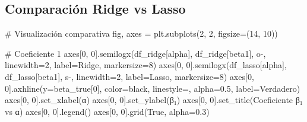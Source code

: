 \documentclass[
  doc,
  floatsintext,
  longtable,
  a4paper,
  nolmodern,
  notxfonts,
  notimes,
  12pt,
  colorlinks=true,linkcolor=blue,citecolor=blue,urlcolor=blue]{apa7}
\newenvironment{Shaded}{\begin{snugshade}}{\end{snugshade}}
\newcommand{\CommentTok}[1]{\textcolor[rgb]{0.37,0.37,0.37}{#1}}
\newcommand{\DecValTok}[1]{\textcolor[rgb]{0.68,0.00,0.00}{#1}}
\newcommand{\FloatTok}[1]{\textcolor[rgb]{0.68,0.00,0.00}{#1}}
\newcommand{\NormalTok}[1]{\textcolor[rgb]{0.00,0.23,0.31}{#1}}
\newcommand{\OperatorTok}[1]{\textcolor[rgb]{0.37,0.37,0.37}{#1}}
\newcommand{\StringTok}[1]{\textcolor[rgb]{0.13,0.47,0.30}{#1}}
\newcommand{\VariableTok}[1]{\textcolor[rgb]{0.07,0.07,0.07}{#1}}
\begin{document}
\subsection{Comparación Ridge vs
Lasso}\label{comparaciuxf3n-ridge-vs-lasso-1}

\begin{Shaded}
\begin{Highlighting}[]
\CommentTok{\# Visualización comparativa}
\NormalTok{fig, axes }\OperatorTok{=}\NormalTok{ plt.subplots(}\DecValTok{2}\NormalTok{, }\DecValTok{2}\NormalTok{, figsize}\OperatorTok{=}\NormalTok{(}\DecValTok{14}\NormalTok{, }\DecValTok{10}\NormalTok{))}

\CommentTok{\# Coeficiente 1}
\NormalTok{axes[}\DecValTok{0}\NormalTok{, }\DecValTok{0}\NormalTok{].semilogx(df\_ridge[}\StringTok{\textquotesingle{}alpha\textquotesingle{}}\NormalTok{], df\_ridge[}\StringTok{\textquotesingle{}beta1\textquotesingle{}}\NormalTok{], }
                    \StringTok{\textquotesingle{}o{-}\textquotesingle{}}\NormalTok{, linewidth}\OperatorTok{=}\DecValTok{2}\NormalTok{, label}\OperatorTok{=}\StringTok{\textquotesingle{}Ridge\textquotesingle{}}\NormalTok{, markersize}\OperatorTok{=}\DecValTok{8}\NormalTok{)}
\NormalTok{axes[}\DecValTok{0}\NormalTok{, }\DecValTok{0}\NormalTok{].semilogx(df\_lasso[}\StringTok{\textquotesingle{}alpha\textquotesingle{}}\NormalTok{], df\_lasso[}\StringTok{\textquotesingle{}beta1\textquotesingle{}}\NormalTok{], }
                    \StringTok{\textquotesingle{}s{-}\textquotesingle{}}\NormalTok{, linewidth}\OperatorTok{=}\DecValTok{2}\NormalTok{, label}\OperatorTok{=}\StringTok{\textquotesingle{}Lasso\textquotesingle{}}\NormalTok{, markersize}\OperatorTok{=}\DecValTok{8}\NormalTok{)}
\NormalTok{axes[}\DecValTok{0}\NormalTok{, }\DecValTok{0}\NormalTok{].axhline(y}\OperatorTok{=}\NormalTok{beta\_true[}\DecValTok{0}\NormalTok{], color}\OperatorTok{=}\StringTok{\textquotesingle{}black\textquotesingle{}}\NormalTok{, linestyle}\OperatorTok{=}\StringTok{\textquotesingle{}{-}{-}\textquotesingle{}}\NormalTok{, }
\NormalTok{                   alpha}\OperatorTok{=}\FloatTok{0.5}\NormalTok{, label}\OperatorTok{=}\StringTok{\textquotesingle{}Verdadero\textquotesingle{}}\NormalTok{)}
\NormalTok{axes[}\DecValTok{0}\NormalTok{, }\DecValTok{0}\NormalTok{].set\_xlabel(}\StringTok{\textquotesingle{}α\textquotesingle{}}\NormalTok{)}
\NormalTok{axes[}\DecValTok{0}\NormalTok{, }\DecValTok{0}\NormalTok{].set\_ylabel(}\StringTok{\textquotesingle{}β₁\textquotesingle{}}\NormalTok{)}
\NormalTok{axes[}\DecValTok{0}\NormalTok{, }\DecValTok{0}\NormalTok{].set\_title(}\StringTok{\textquotesingle{}Coeficiente β₁ vs α\textquotesingle{}}\NormalTok{)}
\NormalTok{axes[}\DecValTok{0}\NormalTok{, }\DecValTok{0}\NormalTok{].legend()}
\NormalTok{axes[}\DecValTok{0}\NormalTok{, }\DecValTok{0}\NormalTok{].grid(}\VariableTok{True}\NormalTok{, alpha}\OperatorTok{=}\FloatTok{0.3}\NormalTok{)}


\end{Highlighting}
\end{Shaded}
\end{document}
